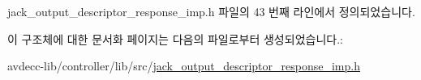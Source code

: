 jack\+\_\+output\+\_\+descriptor\+\_\+response\+\_\+imp.\+h 파일의 43 번째 라인에서 정의되었습니다.



이 구조체에 대한 문서화 페이지는 다음의 파일로부터 생성되었습니다.\+:\begin{DoxyCompactItemize}
\item 
avdecc-\/lib/controller/lib/src/\hyperlink{jack__output__descriptor__response__imp_8h}{jack\+\_\+output\+\_\+descriptor\+\_\+response\+\_\+imp.\+h}\end{DoxyCompactItemize}
